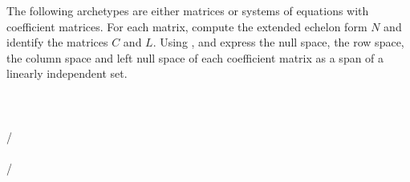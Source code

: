 The following archetypes are either matrices or systems of equations with coefficient matrices.  For each matrix, compute the extended echelon form $N$ and identify the matrices $C$ and $L$.  Using ,   and  express the null space, the row space, the column space and left null space of each coefficient matrix as a span of a linearly independent set.\\
\\ 
\\ 
\\ 
/\\ 
\\ 
/\\ 
\\
\\
%
\\


